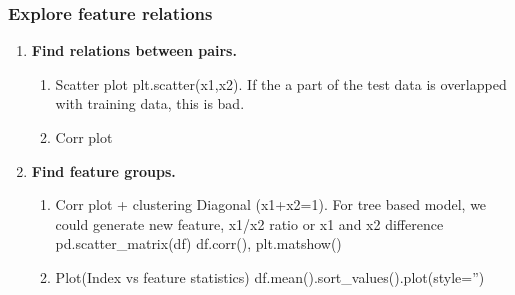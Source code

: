 \documentclass[11pt, twoside]{article}   	%
\begin{document}
\subsubsection{Explore feature relations}
    \begin{enumerate}
      \item  \textbf{Find relations between pairs.}
        \begin{enumerate}
          \item Scatter plot
            \indent plt.scatter(x1,x2). If the a part of the test data is overlapped with training data, this is bad.
           \item Corr plot 
         \end{enumerate}
          
          \item  \textbf{Find feature groups. }
                  \begin{enumerate}
          \item Corr plot + clustering 
          \indent Diagonal (x1+x2=1). For tree based model, we could generate new feature, x1/x2 ratio or x1 and x2 difference
          \indent pd.scatter\_matrix(df)
          \indent  df.corr(), plt.matshow()
          \item Plot(Index vs feature statistics) 
            \indent  df.mean().sort\_values().plot(style='')          
         \end{enumerate}

          
    \end{enumerate}
\end{document}
